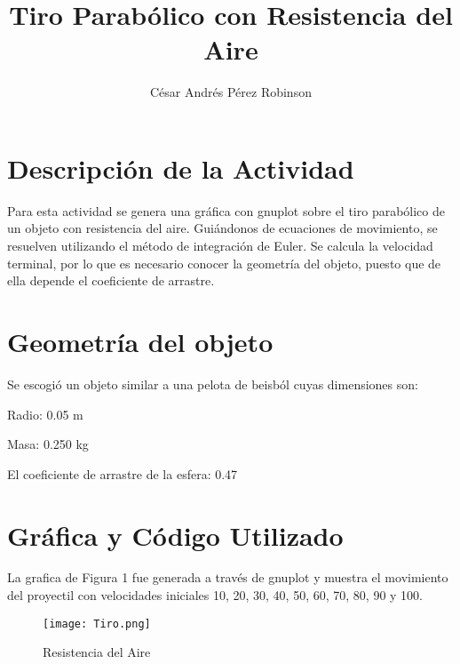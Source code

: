 \documentclass{article}
\title{Tiro Parabólico con Resistencia del Aire}
\author{César Andrés Pérez Robinson}
\begin{document}
\maketitle
\section{Descripción de la Actividad}
Para esta actividad se genera una gráfica con gnuplot sobre el tiro parabólico de un objeto con resistencia del aire. Guiándonos de ecuaciones de movimiento, se resuelven utilizando el método de integración de Euler. Se calcula la velocidad terminal, por lo que es necesario conocer la geometría del objeto, puesto que de ella depende el coeficiente de arrastre.

\section{Geometría del objeto}
Se escogió un objeto similar a una pelota de beisból cuyas dimensiones son:

Radio: 0.05 m
 
Masa: 0.250 kg
 
El coeficiente de arrastre de la esfera: 0.47
\section{Gráfica y Código Utilizado}

La grafica de Figura 1 fue generada a través de gnuplot y muestra el movimiento del proyectil con velocidades iniciales 10, 20, 30, 40, 50, 60, 70, 80, 90 y 100.


\begin{figure}
    \texttt{[image: Tiro.png]}
    \caption{Resistencia del Aire}
    \label{fig:Tiro}
\end{figure}
\end{document}

